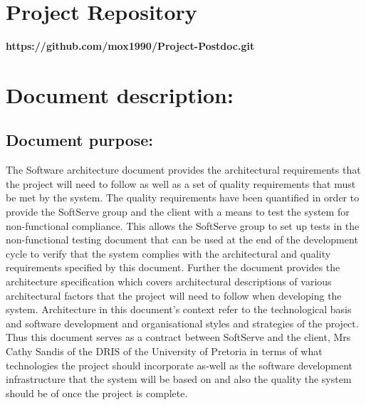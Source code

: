 \documentclass[12pt]{article}
\newcommand{\repo}{https://github.com/mox1990/Project-Postdoc.git}
\begin{document}
\listoffigures
\newpage
\section{Project Repository}
\textbf{\repo}
\newpage
\section{Document description:}


\subsection{Document purpose:}
\vspace{0.2in}
The Software architecture document provides the architectural requirements that the project will need to follow as well as a set of quality requirements that must be met by the system. The quality requirements have been quantified in order to provide the SoftServe group and the client with a means to test the system for non-functional compliance. This allows the SoftServe group to set up tests in the non-functional testing document that can be used at the end of the development cycle to verify that the system complies with the architectural and quality requirements specified by this document. Further the document provides the architecture specification which covers architectural descriptions of various architectural factors that the project will need to follow when developing the system.  Architecture in this document's context refer to the technological basis and software development and organisational styles and strategies of the project. Thus this document serves as a contract between SoftServe and the client, Mrs Cathy Sandis of the DRIS of the University of Pretoria in terms of what technologies the project should incorporate as-well as the software development infrastructure that the system will be based on and also the quality the system should be of once the project is complete.
\vspace{0.2in}
\end{document}
